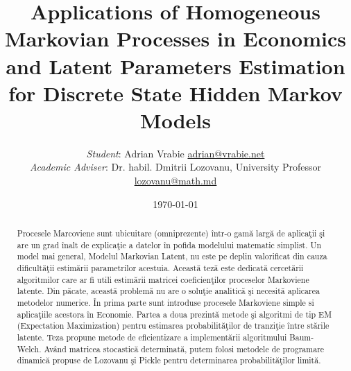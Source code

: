 \documentclass[a4paper,12pt]{article}
\title{\textbf{Applications of Homogeneous Markovian Processes in Economics and Latent Parameters Estimation for Discrete State Hidden Markov Models}}
\author{\textit{Student}: Adrian Vrabie \href{adrian@vrabie.net}{adrian@vrabie.net}\\
		\textit{Academic Adviser}: Dr. habil. Dmitrii Lozovanu, University Professor \\
\href{lozovanu@math.md}{lozovanu@math.md}}
\date{\today}
\begin{document}
\maketitle
\begin{abstract}
Procesele Marcoviene sunt ubicuitare (omniprezente) într-o gamă largă de aplicaţii şi are un grad înalt de explicaţie a datelor în pofida modelului matematic simplist. Un model mai general, Modelul Markovian Latent, nu este pe deplin valorificat din cauza dificultăţii estimării parametrilor acestuia. Această teză este dedicată cercetării algoritmilor care ar fi utili estimării matricei coeficienţilor proceselor Markoviene latente. Din păcate, această problemă nu are o soluţie analitică şi necesită aplicarea metodelor numerice. 
În prima parte sunt introduse procesele Markoviene simple si aplicaţiile acestora în Economie. Partea a doua prezintă metode şi algoritmi de tip EM (Expectation Maximization) pentru estimarea probabilităţilor de tranziţie între stările latente. 
Teza propune metode de eficientizare a implementării algoritmului Baum-Welch. 
Având matricea stocastică determinată, putem folosi metodele de programare dinamică propuse de Lozovanu şi Pickle pentru determinarea probabilităţilor limită. 


\end{abstract}
\end{document}
